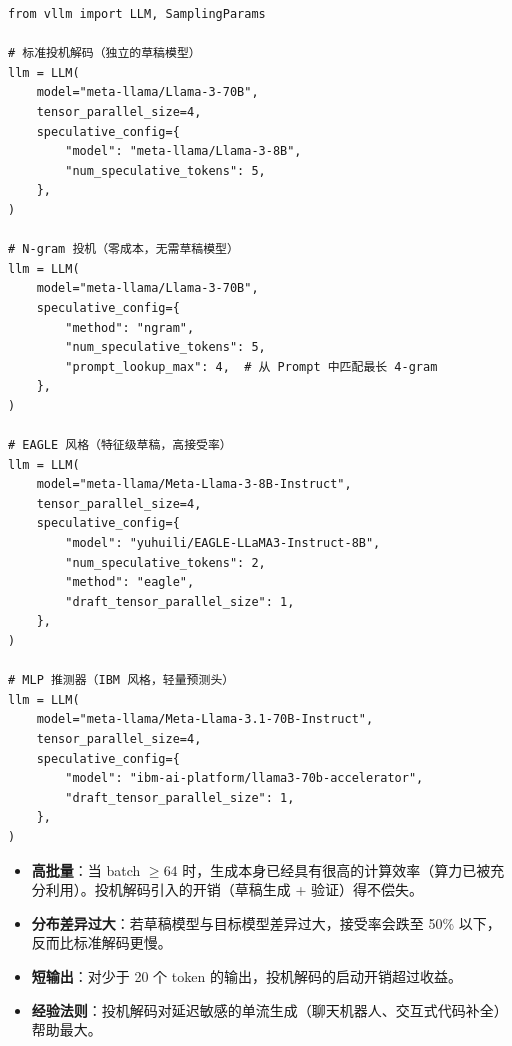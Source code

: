 \begin{lstlisting}[style=pythonstyle]
from vllm import LLM, SamplingParams

# 标准投机解码（独立的草稿模型）
llm = LLM(
    model="meta-llama/Llama-3-70B",
    tensor_parallel_size=4,
    speculative_config={
        "model": "meta-llama/Llama-3-8B",
        "num_speculative_tokens": 5,
    },
)

# N-gram 投机（零成本，无需草稿模型）
llm = LLM(
    model="meta-llama/Llama-3-70B",
    speculative_config={
        "method": "ngram",
        "num_speculative_tokens": 5,
        "prompt_lookup_max": 4,  # 从 Prompt 中匹配最长 4-gram
    },
)

# EAGLE 风格（特征级草稿，高接受率）
llm = LLM(
    model="meta-llama/Meta-Llama-3-8B-Instruct",
    tensor_parallel_size=4,
    speculative_config={
        "model": "yuhuili/EAGLE-LLaMA3-Instruct-8B",
        "num_speculative_tokens": 2,
        "method": "eagle",
        "draft_tensor_parallel_size": 1,
    },
)

# MLP 推测器（IBM 风格，轻量预测头）
llm = LLM(
    model="meta-llama/Meta-Llama-3.1-70B-Instruct",
    tensor_parallel_size=4,
    speculative_config={
        "model": "ibm-ai-platform/llama3-70b-accelerator",
        "draft_tensor_parallel_size": 1,
    },
)
\end{lstlisting}

\begin{warningbox}
\begin{itemize}
  \item \textbf{高批量}：当 batch $\geq 64$ 时，生成本身已经具有很高的计算效率（算力已被充分利用）。投机解码引入的开销（草稿生成 + 验证）得不偿失。
  \item \textbf{分布差异过大}：若草稿模型与目标模型差异过大，接受率会跌至 50\% 以下，反而比标准解码更慢。
  \item \textbf{短输出}：对少于 20 个 token 的输出，投机解码的启动开销超过收益。
  \item \textbf{经验法则}：投机解码对延迟敏感的单流生成（聊天机器人、交互式代码补全）帮助最大。
\end{itemize}
\end{warningbox}

